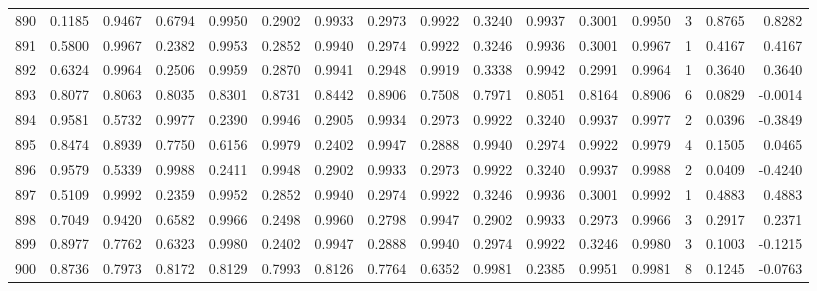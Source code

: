 \begin{tabular}{lrrrrrrrrrrrrrrr}
890 &      0.1185 &  0.9467 &  0.6794 &  0.9950 &  0.2902 &  0.9933 &  0.2973 &  0.9922 &  0.3240 &  0.9937 &   0.3001 &     0.9950 &      3 &                    0.8765 &                     0.8282 \\
891 &      0.5800 &  0.9967 &  0.2382 &  0.9953 &  0.2852 &  0.9940 &  0.2974 &  0.9922 &  0.3246 &  0.9936 &   0.3001 &     0.9967 &      1 &                    0.4167 &                     0.4167 \\
892 &      0.6324 &  0.9964 &  0.2506 &  0.9959 &  0.2870 &  0.9941 &  0.2948 &  0.9919 &  0.3338 &  0.9942 &   0.2991 &     0.9964 &      1 &                    0.3640 &                     0.3640 \\
893 &      0.8077 &  0.8063 &  0.8035 &  0.8301 &  0.8731 &  0.8442 &  0.8906 &  0.7508 &  0.7971 &  0.8051 &   0.8164 &     0.8906 &      6 &                    0.0829 &                    -0.0014 \\
894 &      0.9581 &  0.5732 &  0.9977 &  0.2390 &  0.9946 &  0.2905 &  0.9934 &  0.2973 &  0.9922 &  0.3240 &   0.9937 &     0.9977 &      2 &                    0.0396 &                    -0.3849 \\
895 &      0.8474 &  0.8939 &  0.7750 &  0.6156 &  0.9979 &  0.2402 &  0.9947 &  0.2888 &  0.9940 &  0.2974 &   0.9922 &     0.9979 &      4 &                    0.1505 &                     0.0465 \\
896 &      0.9579 &  0.5339 &  0.9988 &  0.2411 &  0.9948 &  0.2902 &  0.9933 &  0.2973 &  0.9922 &  0.3240 &   0.9937 &     0.9988 &      2 &                    0.0409 &                    -0.4240 \\
897 &      0.5109 &  0.9992 &  0.2359 &  0.9952 &  0.2852 &  0.9940 &  0.2974 &  0.9922 &  0.3246 &  0.9936 &   0.3001 &     0.9992 &      1 &                    0.4883 &                     0.4883 \\
898 &      0.7049 &  0.9420 &  0.6582 &  0.9966 &  0.2498 &  0.9960 &  0.2798 &  0.9947 &  0.2902 &  0.9933 &   0.2973 &     0.9966 &      3 &                    0.2917 &                     0.2371 \\
899 &      0.8977 &  0.7762 &  0.6323 &  0.9980 &  0.2402 &  0.9947 &  0.2888 &  0.9940 &  0.2974 &  0.9922 &   0.3246 &     0.9980 &      3 &                    0.1003 &                    -0.1215 \\
900 &      0.8736 &  0.7973 &  0.8172 &  0.8129 &  0.7993 &  0.8126 &  0.7764 &  0.6352 &  0.9981 &  0.2385 &   0.9951 &     0.9981 &      8 &                    0.1245 &                    -0.0763 \\

\end{tabular}
